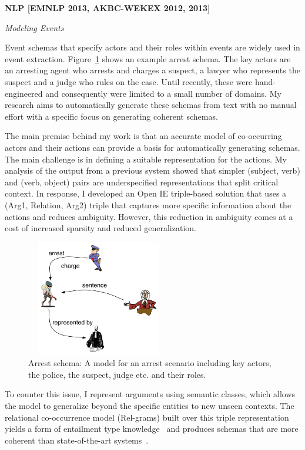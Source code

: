 \documentclass[a4paper,11pt,onecolumn]{article}
\begin{document}
{\bf NLP [EMNLP 2013, AKBC-WEKEX 2012, 2013]}

{\em Modeling Events}

Event schemas that specify actors and their roles within events are widely used in event extraction. Figure~\ref{fig:arrest} shows an example arrest schema. The key actors are an arresting agent who arrests and charges a suspect, a lawyer who represents the suspect and a judge who rules on the case. Until recently, these were hand-engineered and consequently were limited to a small number of domains. My research aims to automatically generate these schemas from text with no manual effort with a specific focus on generating coherent schemas.

The main premise behind my work is that an accurate model of co-occurring actors and their actions can provide a basis for automatically generating schemas. The main challenge is in defining a suitable representation for the actions. My analysis of the output from a previous system showed that simpler (subject, verb) and (verb, object) pairs are underspecified representations that split critical context. In response, I developed an Open IE triple-based solution that uses a (Arg1, Relation, Arg2) triple that captures more specific information about the actions and reduces ambiguity. However, this reduction in ambiguity comes at a cost of increased sparsity and reduced generalization. 
\begin{figure}
	\vspace{-2ex}
	\begin{center}
	\includegraphics[width=2.5in,height=2in]{figures/arrest-scenario} 	
	\vspace{-2ex}
	\caption{\label{fig:arrest} {\small Arrest schema: A model for an arrest scenario including key actors, the police, the suspect, judge etc. and their roles.}}
	\vspace{-2ex}
	\end{center}
\end{figure}
To counter this issue, I represent arguments using semantic classes, which allows the model to generalize beyond the specific entities to new unseen contexts. The relational co-occurrence model (Rel-grams) built over this triple representation yields a form of entailment type knowledge~\cite{balasubramanian-akbc12} and produces schemas that are more coherent than state-of-the-art systems~\cite{balasubramanian-emnlp13}.
\end{document}
